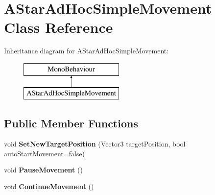 \hypertarget{class_a_star_ad_hoc_simple_movement}{\section{A\+Star\+Ad\+Hoc\+Simple\+Movement Class Reference}
\label{class_a_star_ad_hoc_simple_movement}
}
Inheritance diagram for A\+Star\+Ad\+Hoc\+Simple\+Movement\+:\begin{figure}[H]
\begin{center}
\leavevmode
\includegraphics[height=2.000000cm]{class_a_star_ad_hoc_simple_movement}
\end{center}
\end{figure}
\subsection*{Public Member Functions}
\begin{DoxyCompactItemize}
\item 
\hypertarget{class_a_star_ad_hoc_simple_movement_acc2668195bbf5a95507928e5db30d416}{void {\bfseries Set\+New\+Target\+Position} (Vector3 target\+Position, bool auto\+Start\+Movement=false)}\label{class_a_star_ad_hoc_simple_movement_acc2668195bbf5a95507928e5db30d416}

\item 
\hypertarget{class_a_star_ad_hoc_simple_movement_a0335a43825fae28dae0d7cbdfa2fac63}{void {\bfseries Pause\+Movement} ()}\label{class_a_star_ad_hoc_simple_movement_a0335a43825fae28dae0d7cbdfa2fac63}

\item 
\hypertarget{class_a_star_ad_hoc_simple_movement_acdcac131bf797fe5e4964e47905529bc}{void {\bfseries Continue\+Movement} ()}\label{class_a_star_ad_hoc_simple_movement_acdcac131bf797fe5e4964e47905529bc}

\end{DoxyCompactItemize}
